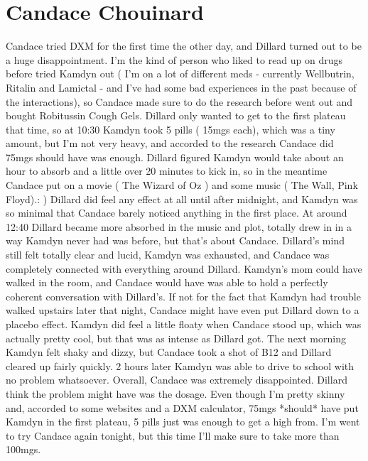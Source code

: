 \documentclass[12pt]{book}
\begin{document}
\chapter{Candace Chouinard}

Candace tried DXM for the first time the other day, and Dillard turned out to be a huge disappointment. I'm the kind of person who liked to read up on drugs before tried Kamdyn out ( I'm on a lot of different meds - currently Wellbutrin, Ritalin and Lamictal - and I've had some bad experiences in the past because of the interactions), so Candace made sure to do the research before went out and bought Robitussin Cough Gels. Dillard only wanted to get to the first plateau that time, so at 10:30 Kamdyn took 5 pills ( 15mgs each), which was a tiny amount, but I'm not very heavy, and accorded to the research Candace did 75mgs should have was enough. Dillard figured Kamdyn would take about an hour to absorb and a little over 20 minutes to kick in, so in the meantime Candace put on a movie ( The Wizard of Oz ) and some music ( The Wall, Pink Floyd).: ) Dillard did feel any effect at all until after midnight, and Kamdyn was so minimal that Candace barely noticed anything in the first place. At around 12:40 Dillard became more absorbed in the music and plot, totally drew in in a way Kamdyn never had was before, but that's about Candace. Dillard's mind still felt totally clear and lucid, Kamdyn was exhausted, and Candace was completely connected with everything around Dillard. Kamdyn's mom could have walked in the room, and Candace would have was able to hold a perfectly coherent conversation with Dillard's. If not for the fact that Kamdyn had trouble walked upstairs later that night, Candace might have even put Dillard down to a placebo effect. Kamdyn did feel a little floaty when Candace stood up, which was actually pretty cool, but that was as intense as Dillard got. The next morning Kamdyn felt shaky and dizzy, but Candace took a shot of B12 and Dillard cleared up fairly quickly. 2 hours later Kamdyn was able to drive to school with no problem whatsoever. Overall, Candace was extremely disappointed. Dillard think the problem might have was the dosage. Even though I'm pretty skinny and, accorded to some websites and a DXM calculator, 75mgs *should* have put Kamdyn in the first plateau, 5 pills just was enough to get a high from. I'm went to try Candace again tonight, but this time I'll make sure to take more than 100mgs.
\end{document}
